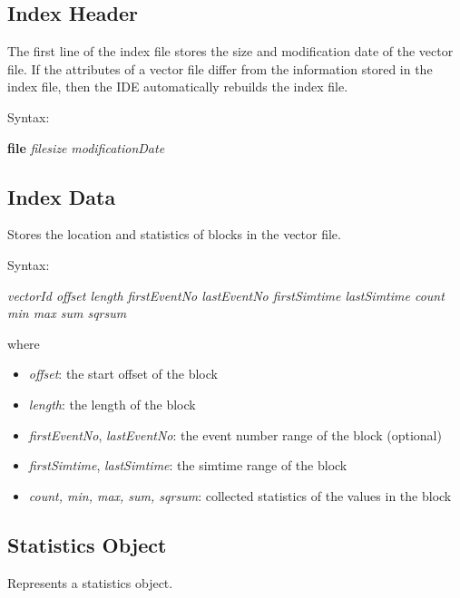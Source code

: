 \subsection{Index Header}
\label{sec:result-file-formats:opp:index-header}

The first line of the index file stores the size and modification date
of the vector file. If the attributes of a vector file differ from
the information stored in the index file, then the IDE automatically
rebuilds the index file.

Syntax:

\hspace{20mm} \textbf{file} \textit{filesize} \textit{modificationDate}

\subsection{Index Data}
\label{sec:result-file-formats:opp:index-data}

Stores the location and statistics of blocks in the vector file.

Syntax:

\hspace{20mm} {\textit{vectorId offset length firstEventNo lastEventNo
                       firstSimtime lastSimtime count min max sum sqrsum}}

where

\begin{itemize}
    \item\textit{offset}: the start offset of the block
    \item\textit{length}: the length of the block
    \item\textit{firstEventNo}, \textit{lastEventNo}:
        the event number range of the block (optional)
    \item\textit{firstSimtime}, \textit{lastSimtime}:
        the simtime range of the block
    \item\textit{count, min, max, sum, sqrsum}:
        collected statistics of the values in the block

\end{itemize}

\subsection{Statistics Object}
\label{sec:result-file-formats:opp:statistics-object}

Represents a statistics object.

